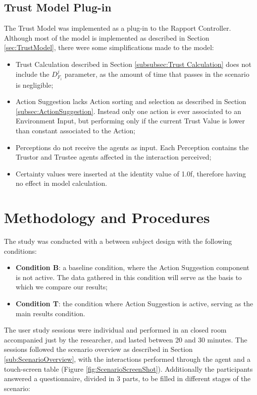 \subsection{Trust Model Plug-in}
\label{subsec:TrustModelPlugin}
The Trust Model was implemented as a plug-in to the Rapport Controller. Although most of the model is implemented as described in Section \ref{sec:TrustModel}, there were some simplifications made to the model:

\begin{itemize}
    \item Trust Calculation described in Section \ref{subsubsec:Trust Calculation} does not include the $D^j_{F_i}$ parameter, as the amount of time that passes in the scenario is negligible;
    \item Action Suggestion lacks Action sorting and selection as described in Section \ref{subsec:ActionSuggestion}. Instead only one action is ever associated to an Environment Input, but performing only if the current Trust Value is lower than constant associated to the Action;
    \item Perceptions do not receive the agents as input. Each Perception contains the Trustor and Trustee agents affected in the interaction perceived;
    \item Certainty values were inserted at the identity value of 1.0f, therefore having no effect in model calculation.
\end{itemize} 

\section{Methodology and Procedures}
\label{sec:MethodologyAndProcedures}
The study was conducted with a between subject design with the following conditions:
\begin{itemize}
    \item \textbf{Condition B}: a baseline condition, where the Action Suggestion component is not active. The data gathered in this condition will serve as the basis to which we compare our results;
    \item \textbf{Condition T}: the condition where Action Suggestion is active, serving as the main results condition.
\end{itemize}

The user study sessions were individual and performed in an closed room accompanied just by the researcher, and lasted between 20 and 30 minutes. The sessions followed the scenario overview as described in Section \ref{sub:ScenarioOverview}, with the interactions performed through the agent and a touch-screen table (Figure \ref{fig:ScenarioScreenShot}). Additionally the participants answered a questionnaire, divided in 3 parts, to be filled in different stages of the scenario: 

